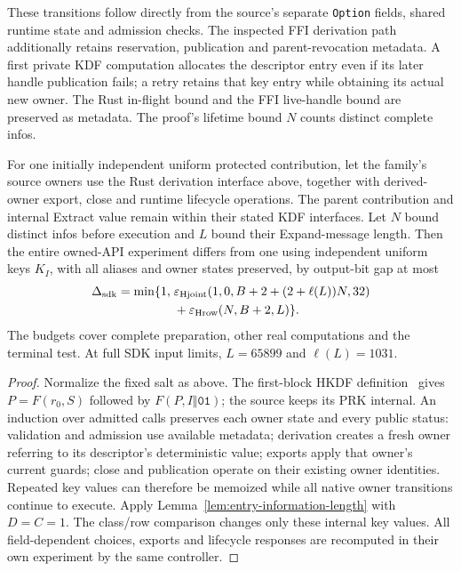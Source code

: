 These transitions follow directly from the source's separate
\texttt{Option} fields, shared runtime state and admission checks. The inspected FFI derivation path additionally retains reservation,
publication and parent-revocation metadata. A first private KDF computation allocates the descriptor
entry even if its later handle publication fails; a retry retains that key
entry while obtaining its actual new owner. The Rust in-flight bound and the
FFI live-handle bound are preserved as metadata. The proof's lifetime bound
$N$ counts distinct complete infos.

\begin{proposition}
\label{prop:sdk-purpose-table}
For one initially independent uniform protected contribution, let the
family's source owners use the Rust derivation interface above, together with
derived-owner export, close and runtime lifecycle operations. The parent
contribution and internal Extract value remain within their stated KDF
interfaces. Let $N$ bound distinct infos before execution and $L$ bound their
Expand-message length. Then the entire owned-API experiment differs from
one using independent uniform keys $K_I$, with all aliases and owner states
preserved, by output-bit gap at most
\begin{equation}
\begin{split}
 \Delta_{\rm sdk}=\min\{1,\;&
 \varepsilon_{\rm Hjoint}(1,0,B+2+(2+\ell(L))N,32)\\
 &+\varepsilon_{\rm Hrow}(N,B+2,L)\}.
\end{split}
 \label{eq:sdk-purpose-error}
\end{equation}
The budgets cover complete preparation, other real computations and the
terminal test. At full SDK input limits, $L=65899$ and $\ell(L)=1031$.
\end{proposition}
\begin{proof}
Normalize the fixed salt as above. The first-block HKDF definition~\cite{rfc5869}
gives $P=F(r_0,S)$ followed by $F(P,I\Vert\mathtt{01})$; the source keeps
its PRK internal.
An induction over admitted calls preserves each owner state and every
public status: validation and admission use available metadata; derivation
creates a fresh owner referring to its descriptor's deterministic value;
exports apply that owner's current guards; close and publication operate
on their existing owner identities. Repeated key values can therefore be
memoized while all native owner transitions continue to execute.
Apply Lemma~\ref{lem:entry-information-length} with $D=C=1$.
The class/row comparison changes only these internal key values. All
field-dependent choices, exports and lifecycle responses are recomputed
in their own experiment by the same controller.
\end{proof}

